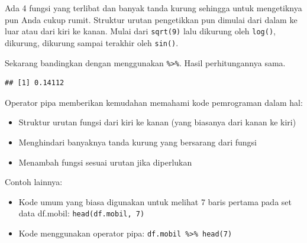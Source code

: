\documentclass[openany]{book}
\newenvironment{Shaded}{\begin{snugshade}}{\end{snugshade}}
\newcommand{\KeywordTok}[1]{\textcolor[rgb]{0.13,0.29,0.53}{\textbf{#1}}}
\newcommand{\DecValTok}[1]{\textcolor[rgb]{0.00,0.00,0.81}{#1}}
\newcommand{\StringTok}[1]{\textcolor[rgb]{0.31,0.60,0.02}{#1}}
\newcommand{\CommentTok}[1]{\textcolor[rgb]{0.56,0.35,0.01}{\textit{#1}}}
\newcommand{\OperatorTok}[1]{\textcolor[rgb]{0.81,0.36,0.00}{\textbf{#1}}}
\newcommand{\NormalTok}[1]{#1}
\providecommand{\tightlist}{%
  \setlength{\itemsep}{0pt}\setlength{\parskip}{0pt}}
\begin{document}
Ada 4 fungsi yang terlibat dan banyak tanda kurung sehingga untuk
mengetiknya pun Anda cukup rumit. Struktur urutan pengetikkan pun
dimulai dari dalam ke luar atau dari kiri ke kanan. Mulai dari
\texttt{sqrt(9)} lalu dikurung oleh \texttt{log()}, dikurung, dikurung
sampai terakhir oleh \texttt{sin()}.

Sekarang bandingkan dengan menggunakan \texttt{\%\textgreater{}\%}.
Hasil perhitungannya sama.

\begin{Shaded}
\end{Shaded}

\begin{verbatim}
## [1] 0.14112
\end{verbatim}

Operator pipa memberikan kemudahan memahami kode pemrograman dalam hal:

\begin{itemize}
\tightlist
\item
  Struktur urutan fungsi dari kiri ke kanan (yang biasanya dari kanan ke
  kiri)
\item
  Menghindari banyaknya tanda kurung yang bersarang dari fungsi
\item
  Menambah fungsi sesuai urutan jika diperlukan
\end{itemize}

Contoh lainnya:

\begin{itemize}
\tightlist
\item
  Kode umum yang biasa digunakan untuk melihat 7 baris pertama pada set
  data df.mobil: \texttt{head(df.mobil,\ 7)}
\item
  Kode menggunakan operator pipa:
  \texttt{df.mobil\ \%\textgreater{}\%\ head(7)}
\end{itemize}

\begin{Shaded}
\end{Shaded}
\end{document}
